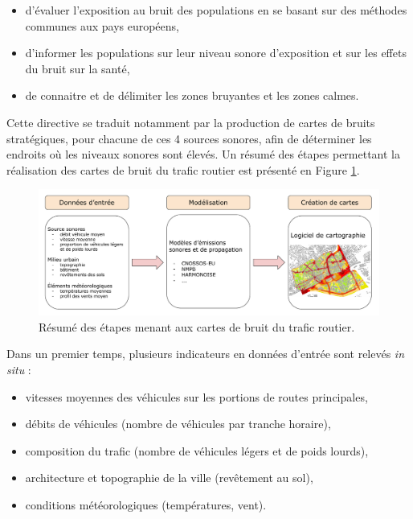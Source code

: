 \begin{itemize}
	\item d'évaluer l'exposition au bruit des populations en se basant sur des méthodes communes aux pays européens,
	\item d'informer les populations sur leur niveau sonore d'exposition et sur les effets du bruit sur la santé,
	\item de connaitre et de délimiter les zones bruyantes et les zones calmes.\\
\end{itemize}

Cette directive se traduit notamment par la production de cartes de bruits stratégiques, pour chacune de ces 4 sources sonores, afin de déterminer les endroits où les niveaux sonores sont élevés. Un résumé des étapes permettant la réalisation des cartes de bruit du trafic routier est présenté en Figure \ref{fig:cartographie}.\\


\begin{figure}[h]
\centering
\includegraphics[width=.85\linewidth]{./figures/cartographie/cartographie.pdf}
\caption{Résumé des étapes menant aux cartes de bruit du trafic routier.}
\label{fig:cartographie}
\end{figure}

Dans un premier temps, plusieurs indicateurs en données d'entrée sont relevés \textit{in situ} :

\begin{itemize}
\item vitesses moyennes des véhicules sur les portions de routes principales,
\item débits de véhicules (nombre de véhicules par tranche horaire),
\item composition du trafic (nombre de véhicules légers et de poids lourds),
\item architecture et topographie de la ville (revêtement au sol),
\item conditions météorologiques (températures, vent).\\
\end{itemize}

